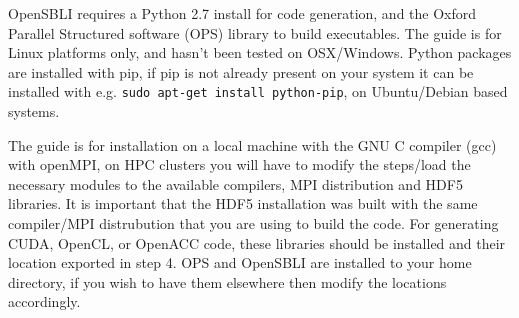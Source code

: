 \documentclass[11pt]{article}
\begin{document}
\maketitle

OpenSBLI requires a Python 2.7 install for code generation, and the Oxford Parallel Structured software (OPS) library to build executables. The guide is for Linux platforms only, and hasn't been tested on OSX/Windows. Python packages are installed with pip, if pip is not already present on your system it can be installed with e.g. \verb|sudo apt-get install python-pip|, on Ubuntu/Debian based systems. 

The guide is for installation on a local machine with the GNU C compiler (gcc) with openMPI, on HPC clusters you will have to modify the steps/load the necessary modules to the available compilers, MPI distribution and HDF5 libraries. It is important that the HDF5 installation was built with the same compiler/MPI distrubution that you are using to build the code. For generating CUDA, OpenCL, or OpenACC code, these libraries should be installed and their location exported in step 4. OPS and OpenSBLI are installed to your home directory, if you wish to have them elsewhere then modify the locations accordingly.
\end{document}
